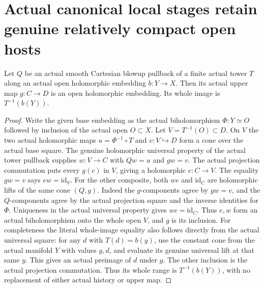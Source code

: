 \section{Actual canonical local stages retain genuine relatively compact open hosts}
\label{sec:hironaka-actual-open-tower-hosts}

\begin{theorem}
\label{hir:actual-open-tower-upper-embedding}
Let $Q$ be an actual smooth Cartesian blowup pullback of a finite
actual tower $T$ along an actual open holomorphic embedding $b:Y\to X$.
Then its actual upper map $g:C\to D$ is an open holomorphic embedding.
Its whole image is $T^{-1}(b(Y))$.
\leanok
\end{theorem}
\begin{proof}
Write the given base embedding as the actual biholomorphism
$\Phi:Y\simeq O$ followed by inclusion of the actual open $O\subset X$.
Let $V=T^{-1}(O)\subset D$. On $V$ the two actual holomorphic maps
$u=\Phi^{-1}\circ T$ and $v:V\hookrightarrow D$ form a cone over the
actual base square. The genuine holomorphic universal property of the
actual tower pullback supplies $w:V\to C$ with $Qw=u$ and $gw=v$.
The actual projection commutation puts every $g(c)$ in $V$, giving a
holomorphic $e:C\to V$. The equality $gw=v$ says $ew=\mathrm{id}_V$.
For the other composite, both $we$ and $\mathrm{id}_C$ are holomorphic
lifts of the same cone $(Q,g)$. Indeed the $g$-components agree by
$gw=v$, and the $Q$-components agree by the actual projection square
and the inverse identities for $\Phi$. Uniqueness in the actual
universal property gives $we=\mathrm{id}_C$. Thus $e,w$ form an
actual biholomorphism onto the whole open $V$, and $g$ is its inclusion.
For completeness the literal whole-image equality also follows directly
from the actual universal square: for any $d$ with $T(d)=b(y)$, use
the constant cone from the actual manifold $Y$ with values $y,d$,
and evaluate its genuine universal lift at that same $y$. This gives
an actual preimage of $d$ under $g$. The other inclusion is the actual
projection commutation. Thus its whole range is $T^{-1}(b(Y))$, with
no replacement of either actual history or upper map.
\end{proof}

